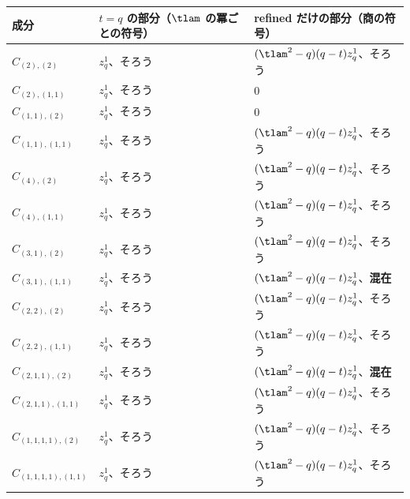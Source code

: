 \begin{center}
\begin{tabular}{lll}
\toprule
成分 & $t = q$ の部分（$\tlam$ の冪ごとの符号） & refined だけの部分（商の符号） \\
\midrule
$\hat C_{(2),(2)}$ & $z_q^{1}$、そろう & $(\tlam^2 - q)(q - t) z_q^{1}$、そろう \\
$\hat C_{(2),(1,1)}$ & $z_q^{1}$、そろう & 0 \\
$\hat C_{(1,1),(2)}$ & $z_q^{1}$、そろう & 0 \\
$\hat C_{(1,1),(1,1)}$ & $z_q^{1}$、そろう & $(\tlam^2 - q)(q - t) z_q^{1}$、そろう \\
$\hat C_{(4),(2)}$ & $z_q^{1}$、そろう & $(\tlam^2 - q)(q - t) z_q^{1}$、そろう \\
$\hat C_{(4),(1,1)}$ & $z_q^{1}$、そろう & $(\tlam^2 - q)(q - t) z_q^{1}$、そろう \\
$\hat C_{(3,1),(2)}$ & $z_q^{1}$、そろう & $(\tlam^2 - q)(q - t) z_q^{1}$、そろう \\
$\hat C_{(3,1),(1,1)}$ & $z_q^{1}$、そろう & $(\tlam^2 - q)(q - t) z_q^{1}$、\textbf{混在} \\
$\hat C_{(2,2),(2)}$ & $z_q^{1}$、そろう & $(\tlam^2 - q)(q - t) z_q^{1}$、そろう \\
$\hat C_{(2,2),(1,1)}$ & $z_q^{1}$、そろう & $(\tlam^2 - q)(q - t) z_q^{1}$、そろう \\
$\hat C_{(2,1,1),(2)}$ & $z_q^{1}$、そろう & $(\tlam^2 - q)(q - t) z_q^{1}$、\textbf{混在} \\
$\hat C_{(2,1,1),(1,1)}$ & $z_q^{1}$、そろう & $(\tlam^2 - q)(q - t) z_q^{1}$、そろう \\
$\hat C_{(1,1,1,1),(2)}$ & $z_q^{1}$、そろう & $(\tlam^2 - q)(q - t) z_q^{1}$、そろう \\
$\hat C_{(1,1,1,1),(1,1)}$ & $z_q^{1}$、そろう & $(\tlam^2 - q)(q - t) z_q^{1}$、そろう \\
\bottomrule
\end{tabular}
\end{center}
